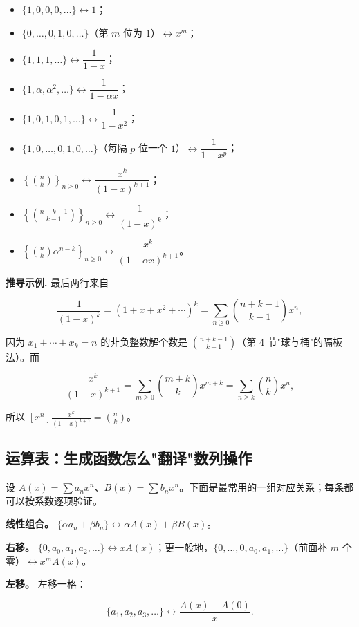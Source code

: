 \begin{itemize}
\item $\{1,0,0,0,\dots\}\longleftrightarrow 1$；
\item $\{0,\dots,0,1,0,\dots\}$（第 $m$ 位为 $1$）$\longleftrightarrow x^m$；
\item $\{1,1,1,\dots\}\longleftrightarrow \dfrac{1}{1-x}$；
\item $\{1,\alpha,\alpha^2,\dots\}\longleftrightarrow \dfrac{1}{1-\alpha x}$；
\item $\{1,0,1,0,1,\dots\}\longleftrightarrow \dfrac{1}{1-x^2}$；
\item $\{1,0,\dots,0,1,0,\dots\}$（每隔 $p$ 位一个 $1$）$\longleftrightarrow \dfrac{1}{1-x^p}$；
\item $\left\{\binom nk\right\}_{n\ge0}\longleftrightarrow \dfrac{x^k}{(1-x)^{k+1}}$；
\item $\left\{\binom{n+k-1}{k-1}\right\}_{n\ge0}\longleftrightarrow \dfrac{1}{(1-x)^k}$；
\item $\left\{\binom{n}{k}\alpha^{n-k}\right\}_{n\ge0}\longleftrightarrow \dfrac{x^k}{(1-\alpha x)^{k+1}}$。
\end{itemize}


\textbf{推导示例.} 最后两行来自

\[
\frac{1}{(1-x)^k}=(1+x+x^2+\cdots)^k=\sum_{n\ge0}\binom{n+k-1}{k-1}x^n,
\]

因为 $x_1+\cdots+x_k=n$ 的非负整数解个数是 $\binom{n+k-1}{k-1}$（第 4 节"球与桶"的隔板法）。而

\[
\frac{x^k}{(1-x)^{k+1}}=\sum_{m\ge0}\binom{m+k}{k}x^{m+k}=\sum_{n\ge k}\binom nk x^n,
\]

所以 $[x^n]\frac{x^k}{(1-x)^{k+1}}=\binom nk$。

\subsection{运算表：生成函数怎么"翻译"数列操作}


设 $A(x)=\sum a_nx^n$、$B(x)=\sum b_nx^n$。下面是最常用的一组对应关系；每条都可以按系数逐项验证。

\textbf{线性组合。} $\{\alpha a_n+\beta b_n\}\longleftrightarrow \alpha A(x)+\beta B(x)$。

\textbf{右移。} $\{0,a_0,a_1,a_2,\dots\}\longleftrightarrow xA(x)$；更一般地，$\{0,\dots,0,a_0,a_1,\dots\}$（前面补 $m$ 个零）$\longleftrightarrow x^mA(x)$。

\textbf{左移。} 左移一格：

\[
\{a_1,a_2,a_3,\dots\}\longleftrightarrow \frac{A(x)-A(0)}{x}.
\]

